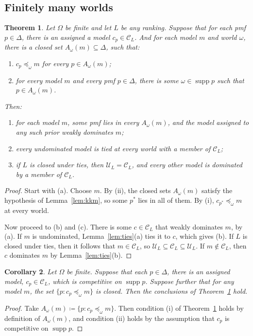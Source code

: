 \documentclass[11pt]{article}
\newtheorem{theorem}{Theorem}[section]
\newtheorem{corollary}[theorem]{Corollary}
\theoremstyle{definition}
\newcommand{\C}{\mathcal C}
\newcommand{\U}{\mathcal U}
\newcommand{\supp}{\operatorname{supp}}
\begin{document}
\subsection{Finitely many worlds}
\begin{theorem}\label{thm:finite}
Let $\Omega$ be finite and let $L$ be any ranking. Suppose that for each pmf $p\in\Delta$, there is an assigned a model $c_p\in\C_L$. And for each model $m$ and world $\omega$, there is a closed set $A_\omega(m)\subseteq\Delta$, such that:
\begin{enumerate}[label=(\roman*)]
\item $c_p\preceq_\omega m$ for every $p\in A_\omega(m)$;
\item for every model $m$ and every pmf $p\in\Delta$, there is some $\omega\in\supp p$ such that $p\in A_\omega(m)$.
\end{enumerate}
Then:
\begin{enumerate}[label=(\alph*)]
\item for each model $m$, some pmf lies in every $A_\omega(m)$, and the model assigned to any such prior weakly dominates $m$;
\item every undominated model is tied at every world with a member of $\C_L$;
\item if $L$ is closed under ties, then $\U_L=\C_L$, and every other model is dominated by a member of $\C_L$.
\end{enumerate}
\end{theorem}
\begin{proof}
Start with (a). Choose $m$. By (ii), the closed sets $A_\omega(m)$ satisfy the hypothesis of Lemma~\ref{lem:kkm}, so some $p^*$ lies in all of them. By (i), $c_{p^*}\preceq_\omega m$ at every world. 

Now proceed to (b) and (c). There is some $c\in\C_L$ that weakly dominates $m$, by (a). If $m$ is undominated, Lemma~\ref{lem:ties}(a) ties it to $c$, which gives (b). If $L$ is closed under ties, then it follows that $m\in\C_L$, so $\U_L\subseteq\C_L\subseteq\U_L$. If $m\notin\C_L$, then $c$ dominates $m$ by Lemma~\ref{lem:ties}(b).
\end{proof}

\begin{corollary}\label{cor:closed-choice}
Let $\Omega$ be finite. Suppose that each $p\in\Delta$, there is an assigned model, $c_p\in\C_L$, which is competitive on $\supp p$. Suppose further that for any model $m$, the set $\{p:c_p\preceq_\omega m\}$ is closed. Then the conclusions of Theorem~\ref{thm:finite} hold.
\end{corollary}
\begin{proof}
Take $A_\omega(m)\coloneqq\{p:c_p\preceq_\omega m\}$. Then condition (i) of Theorem~\ref{thm:finite} holds by definition of $A_\omega(m)$, and condition (ii) holds by the assumption that $c_p$ is competitive on $\supp p$.
\end{proof}
\end{document}
